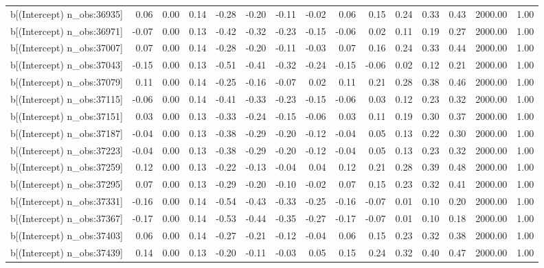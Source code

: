 \begin{table}[ht]
\begin{tabular}{rrrrrrrrrrrrrrr}
  b[(Intercept) n\_obs:36935] & 0.06 & 0.00 & 0.14 & -0.28 & -0.20 & -0.11 & -0.02 & 0.06 & 0.15 & 0.24 & 0.33 & 0.43 & 2000.00 & 1.00 \\ 
  b[(Intercept) n\_obs:36971] & -0.07 & 0.00 & 0.13 & -0.42 & -0.32 & -0.23 & -0.15 & -0.06 & 0.02 & 0.11 & 0.19 & 0.27 & 2000.00 & 1.00 \\ 
  b[(Intercept) n\_obs:37007] & 0.07 & 0.00 & 0.14 & -0.28 & -0.20 & -0.11 & -0.03 & 0.07 & 0.16 & 0.24 & 0.33 & 0.44 & 2000.00 & 1.00 \\ 
  b[(Intercept) n\_obs:37043] & -0.15 & 0.00 & 0.13 & -0.51 & -0.41 & -0.32 & -0.24 & -0.15 & -0.06 & 0.02 & 0.12 & 0.21 & 2000.00 & 1.00 \\ 
  b[(Intercept) n\_obs:37079] & 0.11 & 0.00 & 0.14 & -0.25 & -0.16 & -0.07 & 0.02 & 0.11 & 0.21 & 0.28 & 0.38 & 0.46 & 2000.00 & 1.00 \\ 
  b[(Intercept) n\_obs:37115] & -0.06 & 0.00 & 0.14 & -0.41 & -0.33 & -0.23 & -0.15 & -0.06 & 0.03 & 0.12 & 0.23 & 0.32 & 2000.00 & 1.00 \\ 
  b[(Intercept) n\_obs:37151] & 0.03 & 0.00 & 0.13 & -0.33 & -0.24 & -0.15 & -0.06 & 0.03 & 0.11 & 0.19 & 0.30 & 0.37 & 2000.00 & 1.00 \\ 
  b[(Intercept) n\_obs:37187] & -0.04 & 0.00 & 0.13 & -0.38 & -0.29 & -0.20 & -0.12 & -0.04 & 0.05 & 0.13 & 0.22 & 0.30 & 2000.00 & 1.00 \\ 
  b[(Intercept) n\_obs:37223] & -0.04 & 0.00 & 0.13 & -0.38 & -0.29 & -0.20 & -0.12 & -0.04 & 0.05 & 0.13 & 0.23 & 0.32 & 2000.00 & 1.00 \\ 
  b[(Intercept) n\_obs:37259] & 0.12 & 0.00 & 0.13 & -0.22 & -0.13 & -0.04 & 0.04 & 0.12 & 0.21 & 0.28 & 0.39 & 0.48 & 2000.00 & 1.00 \\ 
  b[(Intercept) n\_obs:37295] & 0.07 & 0.00 & 0.13 & -0.29 & -0.20 & -0.10 & -0.02 & 0.07 & 0.15 & 0.23 & 0.32 & 0.41 & 2000.00 & 1.00 \\ 
  b[(Intercept) n\_obs:37331] & -0.16 & 0.00 & 0.14 & -0.54 & -0.43 & -0.33 & -0.25 & -0.16 & -0.07 & 0.01 & 0.10 & 0.20 & 2000.00 & 1.00 \\ 
  b[(Intercept) n\_obs:37367] & -0.17 & 0.00 & 0.14 & -0.53 & -0.44 & -0.35 & -0.27 & -0.17 & -0.07 & 0.01 & 0.10 & 0.18 & 2000.00 & 1.00 \\ 
  b[(Intercept) n\_obs:37403] & 0.06 & 0.00 & 0.14 & -0.27 & -0.21 & -0.12 & -0.04 & 0.06 & 0.15 & 0.23 & 0.32 & 0.38 & 2000.00 & 1.00 \\ 
  b[(Intercept) n\_obs:37439] & 0.14 & 0.00 & 0.13 & -0.20 & -0.11 & -0.03 & 0.05 & 0.15 & 0.24 & 0.32 & 0.40 & 0.47 & 2000.00 & 1.00 \\ 

\end{tabular}
\end{table}
